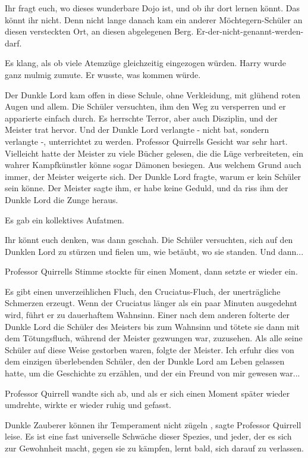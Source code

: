 \glqq Ihr fragt euch, wo dieses wunderbare Dojo ist, und ob ihr dort lernen
könnt. Das könnt ihr nicht. Denn nicht lange danach kam ein anderer
Möchtegern-Schüler an diesen versteckten Ort, an diesen abgelegenen Berg.
Er-der-nicht-genannt-werden-darf.\grqq{}

Es klang, als ob viele Atemzüge gleichzeitig eingezogen würden. Harry wurde ganz
mulmig zumute. Er wusste, was kommen würde.

\glqq Der Dunkle Lord kam offen in diese Schule, ohne Verkleidung, mit glühend
roten Augen und allem. Die Schüler versuchten, ihm den Weg zu versperren und er
apparierte einfach durch. Es herrschte Terror, aber auch Disziplin, und der
Meister trat hervor. Und der Dunkle Lord verlangte - nicht bat, sondern
verlangte -, unterrichtet zu werden.\grqq{} Professor Quirrells Gesicht war sehr
hart. \glqq Vielleicht hatte der Meister zu viele Bücher gelesen, die die Lüge
verbreiteten, ein wahrer Kampfkünstler könne sogar Dämonen besiegen. Aus welchem
Grund auch immer, der Meister weigerte sich. Der Dunkle Lord fragte, warum er
kein Schüler sein könne. Der Meister sagte ihm, er habe keine Geduld, und da
riss ihm der Dunkle Lord die Zunge heraus.\grqq{}

Es gab ein kollektives Aufatmen.

\glqq Ihr könnt euch denken, was dann geschah. Die Schüler versuchten, sich auf
den Dunklen Lord zu stürzen und fielen um, wie betäubt, wo sie standen. Und
dann...\grqq{}

Professor Quirrells Stimme stockte für einen Moment, dann setzte er wieder ein.

\glqq Es gibt einen unverzeihlichen Fluch, den Cruciatus-Fluch, der
unerträgliche Schmerzen erzeugt. Wenn der Cruciatus länger als ein paar Minuten
ausgedehnt wird, führt er zu dauerhaftem Wahnsinn. Einer nach dem anderen
folterte der Dunkle Lord die Schüler des Meisters bis zum Wahnsinn und tötete
sie dann mit dem Tötungsfluch, während der Meister gezwungen war, zuzusehen. Als
alle seine Schüler auf diese Weise gestorben waren, folgte der Meister. Ich
erfuhr dies von dem einzigen überlebenden Schüler, den der Dunkle Lord am Leben
gelassen hatte, um die Geschichte zu erzählen, und der ein Freund von mir
gewesen war...\grqq{}

Professor Quirrell wandte sich ab, und als er sich einen Moment später wieder
umdrehte, wirkte er wieder ruhig und gefasst.

\glqq Dunkle Zauberer können ihr Temperament nicht zügeln\grqq{} , sagte
Professor Quirrell leise. \glqq Es ist eine fast universelle Schwäche dieser
Spezies, und jeder, der es sich zur Gewohnheit macht, gegen sie zu kämpfen,
lernt bald, sich darauf zu verlassen.

